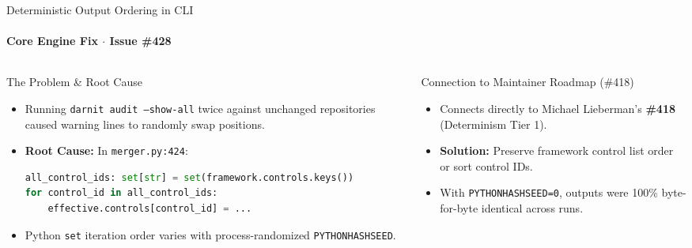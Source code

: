 \documentclass[aspectratio=169]{beamer}
\begin{document}
\begin{frame}{Deterministic Output Ordering in CLI}
    \framesubtitle{Core Engine Fix $\cdot$ Issue \#428}
    \begin{columns}[T]
        \begin{column}{0.48\textwidth}
            \begin{alertblock}{The Problem \& Root Cause}
                \small
                \begin{itemize}
                    \item Running \texttt{darnit audit --show-all} twice against unchanged repositories caused warning lines to randomly swap positions.
                    \item \textbf{Root Cause:} In \texttt{merger.py:424}:
                    \begin{lstlisting}[language=Python]
all_control_ids: set[str] = set(framework.controls.keys())
for control_id in all_control_ids:
    effective.controls[control_id] = ...
                    \end{lstlisting}
                    \item Python \texttt{set} iteration order varies with process-randomized \texttt{PYTHONHASHSEED}.
                \end{itemize}
            \end{alertblock}
        \end{column}
        \begin{column}{0.48\textwidth}
            \begin{block}{Connection to Maintainer Roadmap (\#418)}
                \small
                \begin{itemize}
                    \item Connects directly to Michael Lieberman's \textbf{\#418} (Determinism Tier 1).
                    \item \textbf{Solution:} Preserve framework control list order or sort control IDs.
                    \item With \texttt{PYTHONHASHSEED=0}, outputs were 100\% byte-for-byte identical across runs.
                \end{itemize}
            \end{block}
        \end{column}
    \end{columns}
\end{frame}
\end{document}
